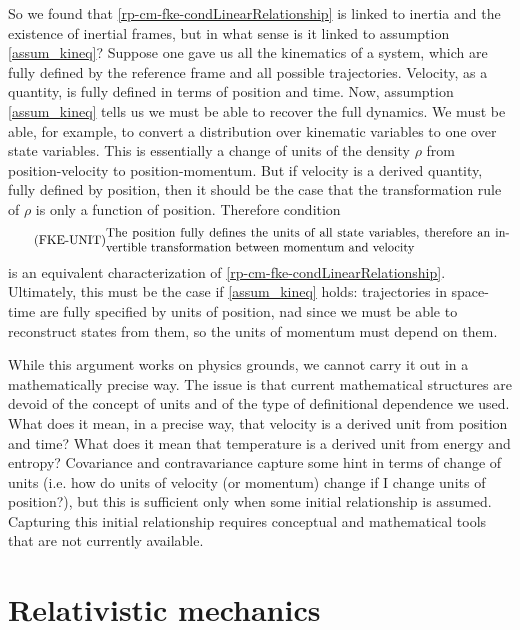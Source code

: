 So we found that \ref{rp-cm-fke-condLinearRelationship} is linked to inertia and the existence of inertial frames, but in what sense is it linked to assumption \ref{assum_kineq}? Suppose one gave us all the kinematics of a system, which are fully defined by the reference frame and all possible trajectories. Velocity, as a quantity, is fully defined in terms of position and time. Now, assumption \ref{assum_kineq} tells us we must be able to recover the full dynamics. We must be able, for example, to convert a distribution over kinematic variables to one over state variables. This is essentially a change of units of the density $\rho$ from position-velocity to position-momentum. But if velocity is a derived quantity, fully defined by position, then it should be the case that the transformation rule of $\rho$ is only a function of position. Therefore condition
\begin{equation}\label{rp-cm-fke-condUnits}
	\tag{FKE-UNIT}
	\eqtext{The position fully defines the units of all state variables, therefore an invertible transformation between momentum and velocity}
\end{equation}
is an equivalent characterization of \ref{rp-cm-fke-condLinearRelationship}. Ultimately, this must be the case if \ref{assum_kineq} holds: trajectories in space-time are fully specified by units of position, nad since we must be able to reconstruct states from them, so the units of momentum must depend on them.

While this argument works on physics grounds, we cannot carry it out in a mathematically precise way. The issue is that current mathematical structures are devoid of the concept of units and of the type of definitional dependence we used. What does it mean, in a precise way, that velocity is a derived unit from position and time? What does it mean that temperature is a derived unit from energy and entropy? Covariance and contravariance capture some hint in terms of change of units (i.e. how do units of velocity (or momentum) change if I change units of position?), but this is sufficient only when some initial relationship is assumed. Capturing this initial relationship requires conceptual and mathematical tools that are not currently available.


\section{Relativistic mechanics}

